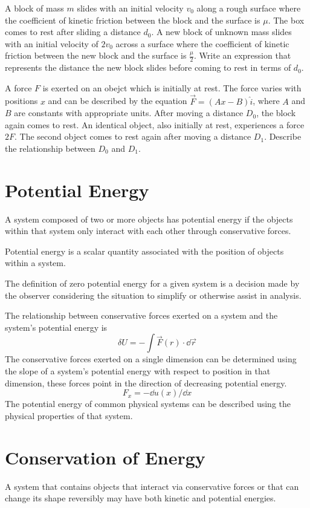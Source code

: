 \documentclass[../mech.tex]{subfiles}
\begin{document}
\ex A block of mass $m$ slides with an initial velocity $v_0$ along a rough surface where the coefficient of kinetic friction between the block and the surface is $\mu$. The box comes to rest 
after sliding a distance $d_0$. A new block of unknown mass slides with an initial velocity of $2v_0$ across a surface where the coefficient of kinetic friction between the new block and the surface is $\frac{\mu}{2}$.
Write an expression that represents the distance the new block slides before coming to rest in terms of $d_0$.

\ex A force $F$ is exerted on an obejct which is initially at rest. The force varies with positions $x$ and can be described by the equation $\vec{F}=(Ax-B)\hat{i}$, where $A$ and $B$ are constants with appropriate units.
After moving a distance $D_0$, the block again comes to rest. An identical object, also initially at rest, experiences a force $2F$. The second object comes to rest again after moving a distance $D_1$. Describe the relationship between $D_0$ and $D_1$.

\section{Potential Energy}
A system composed of two or more objects has potential energy if the objects within that system only interact with each other through conservative forces.

Potential energy is a scalar quantity associated with the position of objects within a system.

The definition of zero potential energy for a given system is a decision made by the observer considering the situation to simplify or otherwise assist in analysis.

The relationship between conservative forces exerted on a system and the system's potential energy is 
\[ \delta U = -\int \vec{F}(r)\cdot \dd \vec{r} \]
The conservative forces exerted on a single dimension can be determined using the slope of a system's potential energy with respect to position in that dimension, these forces point in the direction of decreasing potential energy.
\[ F_x = -\dd u(x)/\dd x\]
The potential energy of common physical systems can be described using the physical properties of that system.

\section{Conservation of Energy}
A system that contains objects that interact via conservative forces or that can change its shape reversibly may have both kinetic and potential energies.
\end{document}

